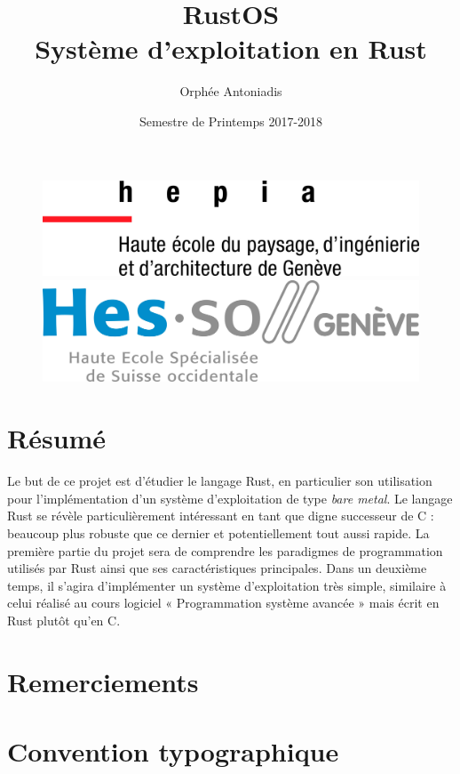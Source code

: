 \documentclass[a4paper]{article}
\title{RustOS \protect\\ Système d’exploitation en Rust}
\author{Orphée Antoniadis}
\affil{\small Projet de Bachelor - Prof. Florent Glück}
\affil{\small Hepia ITI 3\up{ème} année}
\date{Semestre de Printemps 2017-2018}
\begin{document}
\maketitle

\begin{figure}[!b]
	\centering
	\begin{minipage}{.5\textwidth}
		\centering
		\includegraphics[width=.6\linewidth]{images/hepia.jpg}
	\end{minipage}%
	\begin{minipage}{.5\textwidth}
		\centering
		\includegraphics[width=.6\linewidth]{images/hesso.jpg}
	\end{minipage}
\end{figure}
\newpage

\section*{Résumé}
Le but de ce projet est d’étudier le langage Rust, en particulier son utilisation
pour l’implémentation d’un système d’exploitation de type \textit{bare metal}. Le
langage Rust se révèle particulièrement intéressant en tant que digne successeur de C :
beaucoup plus robuste que ce dernier et potentiellement tout aussi rapide. La première
partie du projet sera de comprendre les paradigmes de programmation utilisés par
Rust ainsi que ses caractéristiques principales. Dans un deuxième temps, il s’agira
d’implémenter un système d’exploitation très simple, similaire à celui réalisé au
cours logiciel « Programmation système avancée » mais écrit en Rust plutôt qu’en C.

\newpage
\setcounter{tocdepth}{3}
\tableofcontents
\newpage
\listoffigures
\newpage

\section*{Remerciements}
\newpage

\section*{Convention typographique}
\newpage
\end{document}
